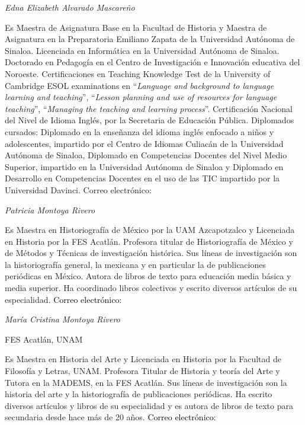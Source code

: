 \bigskip

{ 
\textit{Edna Elizabeth Alvarado Mascareño}}

{ 
Es Maestra de Asignatura Base en la Facultad de Historia y Maestra de
Asignatura en la Preparatoria Emiliano Zapata de la Universidad Autónoma de
Sinaloa. Licenciada en Informática en la Universidad Autónoma de Sinaloa.
Doctorado en Pedagogía en el Centro de Investigación e Innovación 
educativa del Noroeste. Certificaciones en Teaching Knowledge Test de la
University of Cambridge ESOL examinations en “\textit{Language and
background to language learning and teaching}”, “\textit{Lesson planning
and use of resources for language teaching}”, “\textit{Managing the
teaching and learning process}”. Certificación  Nacional del Nivel de
Idioma Inglés, por la Secretaria de Educación Pública. Diplomados cursados:
Diplomado en la enseñanza del idioma inglés enfocado a niños y
adolescentes, impartido por el Centro de Idiomas Culiacán de la Universidad
Autónoma de Sinaloa, Diplomado en Competencias Docentes del Nivel Medio
Superior, impartido en la Universidad Autónoma de Sinaloa y Diplomado en
Desarrollo en Competencias Docentes en el uso de las TIC impartido por la
Universidad Davinci. Correo electrónico:
\href{mailto:edna83_am@hotmail.com}{\textstyleInternetlink{\textit{\textcolor{blue}{edna83\_am@hotmail.com}}}}}


\bigskip

{ 
\textit{Patricia Montoya Rivero}}

{ 
Es Maestra en Historiografía de México por la UAM Azcapotzalco y Licenciada
en Historia por la FES Acatlán. Profesora titular de Historiografía de
México y de Métodos y Técnicas de investigación histórica. Sus líneas de
investigación son la historiografía general, la mexicana y en particular la
de publicaciones periódicas en México. Autora de libros de texto para
educación media básica y media superior. Ha coordinado libros colectivos y
escrito diversos artículos de su especialidad. \textcolor{black}{Correo
electrónico:
}\href{mailto:pa_mon_ri@yahoo.com.mx}{\textstyleInternetlink{\textcolor{blue}{pa\_mon\_ri@yahoo.com.mx}}}}


\bigskip


\bigskip

{ 
\textit{María Cristina Montoya Rivero}}

{ 
FES Acatlán, UNAM}

{ 
Es Maestra en Historia del Arte y Licenciada en Historia por la Facultad de
Filosofía y Letras, UNAM. Profesora Titular de Historia y teoría del Arte y
Tutora en la MADEMS, en la FES Acatlán. Sus líneas de investigación son la
historia del arte y la historiografía de publicaciones periódicas. Ha
escrito diversos artículos y libros de su especialidad y es autora de
libros de texto para secundaria desde hace más de 20 años.
\textcolor{black}{Correo electrónico:
}\href{mailto:montriv_2000@yahoo.com}{\textstyleInternetlink{\textcolor{blue}{montriv\_2000@yahoo.com}}}}


